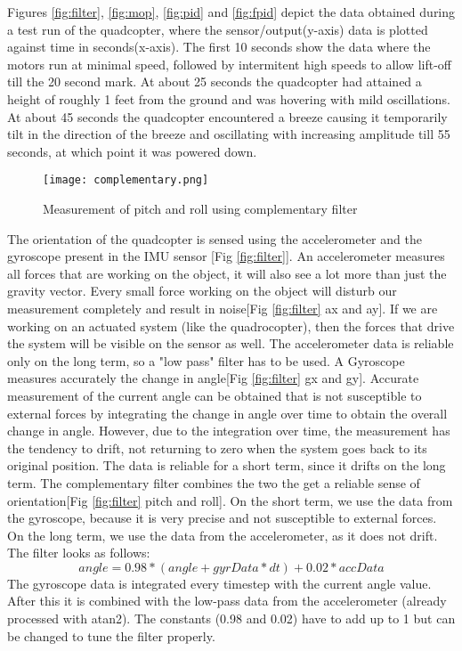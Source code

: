 Figures \ref{fig:filter}, \ref{fig:mop}, \ref{fig:pid} and \ref{fig:fpid} depict the data obtained during a test run of the quadcopter, where the sensor/output(y-axis) data is plotted against time in seconds(x-axis).
\newline
The first 10 seconds show the data where the motors run at minimal speed, followed by intermitent high speeds to allow lift-off till the 20 second mark. At about 25 seconds the quadcopter had attained a height of roughly 1 feet from the ground and was hovering with mild oscillations. At about 45 seconds the quadcopter encountered a breeze causing it temporarily tilt in the direction of the breeze and oscillating with increasing amplitude till 55 seconds, at which point it was powered down.
\begin{figure}[H]
  \centering
  \texttt{[image: complementary.png]}
  \caption{Measurement of pitch and roll using complementary filter \label{fig:filter}}
  \label{Measurement of pitch and roll}	
\end{figure}
The orientation of the quadcopter is sensed using the accelerometer and the gyroscope present in the IMU sensor [Fig \ref{fig:filter}].
\newline
An accelerometer measures all forces that are working on the object, it will also see a lot more than just the gravity vector. Every small force working on the object will disturb our measurement completely and result in noise[Fig \ref{fig:filter} ax and ay]. If we are working on an actuated system (like the quadrocopter), then the forces that drive the system will be visible on the sensor as well. The accelerometer data is reliable only on the long term, so a "low pass" filter has to be used.
\newline
A Gyroscope measures accurately the change in angle[Fig \ref{fig:filter} gx and gy]. Accurate measurement of the current angle can be obtained that is not susceptible to external forces by integrating the change in angle over time to obtain the overall change in angle. However, due to the integration over time, the measurement has the tendency to drift, not returning to zero when the system goes back to its original position. The  data is reliable for a short term, since it drifts on the long term.
\newline
The complementary filter combines the two the get a reliable sense of orientation[Fig \ref{fig:filter} pitch and roll]. On the short term, we use the data from the gyroscope, because it is very precise and not susceptible to external forces. On the long term, we use the data from the accelerometer, as it does not drift. The filter looks as follows:
\begin{equation}
angle = 0.98*(angle+gyrData*dt)+0.02*accData
\end{equation}
The gyroscope data is integrated every timestep with the current angle value. After this it is combined with the low-pass data from the accelerometer (already processed with atan2). The constants (0.98 and 0.02) have to add up to 1 but can be changed to tune the filter properly.

